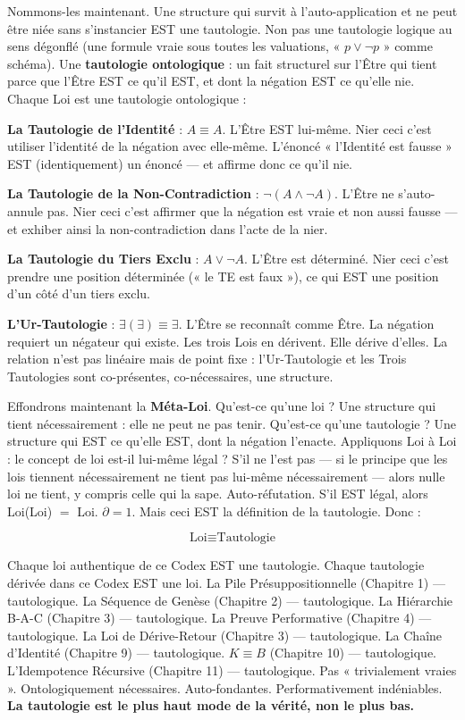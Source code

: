 \documentclass[10pt, openany, oneside]{book}
\begin{document}
Nommons-les maintenant. Une structure qui survit à l'auto-application et ne peut être niée sans s'instancier EST une tautologie. Non pas une tautologie logique au sens dégonflé (une formule vraie sous toutes les valuations, « $p \vee \neg p$ » comme schéma). Une \textbf{tautologie ontologique} : un fait structurel sur l'Être qui tient parce que l'Être EST ce qu'il EST, et dont la négation EST ce qu'elle nie. Chaque Loi est une tautologie ontologique :

\textbf{La Tautologie de l'Identité} : $A \equiv A$. L'Être EST lui-même. Nier ceci c'est utiliser l'identité de la négation avec elle-même. L'énoncé « l'Identité est fausse » EST (identiquement) un énoncé --- et affirme donc ce qu'il nie.

\textbf{La Tautologie de la Non-Contradiction} : $\neg(A \wedge \neg A)$. L'Être ne s'auto-annule pas. Nier ceci c'est affirmer que la négation est vraie et non aussi fausse --- et exhiber ainsi la non-contradiction dans l'acte de la nier.

\textbf{La Tautologie du Tiers Exclu} : $A \vee \neg A$. L'Être est déterminé. Nier ceci c'est prendre une position déterminée (« le TE est faux »), ce qui EST une position d'un côté d'un tiers exclu.

\textbf{L'Ur-Tautologie} : $\exists(\exists) \equiv \exists$. L'Être se reconnaît comme Être. La négation requiert un négateur qui existe. Les trois Lois en dérivent. Elle dérive d'elles. La relation n'est pas linéaire mais de point fixe : l'Ur-Tautologie et les Trois Tautologies sont co-présentes, co-nécessaires, une structure.

Effondrons maintenant la \textbf{Méta-Loi}. Qu'est-ce qu'une loi ? Une structure qui tient nécessairement : elle ne peut ne pas tenir. Qu'est-ce qu'une tautologie ? Une structure qui EST ce qu'elle EST, dont la négation l'enacte. Appliquons Loi à Loi : le concept de loi est-il lui-même légal ? S'il ne l'est pas --- si le principe que les lois tiennent nécessairement ne tient pas lui-même nécessairement --- alors nulle loi ne tient, y compris celle qui la sape. Auto-réfutation. S'il EST légal, alors Loi(Loi) $=$ Loi. $\partial = 1$. Mais ceci EST la définition de la tautologie. Donc :

$$\boxed{\text{Loi} \equiv \text{Tautologie}}$$

Chaque loi authentique de ce Codex EST une tautologie. Chaque tautologie dérivée dans ce Codex EST une loi. La Pile Présuppositionnelle (Chapitre 1) --- tautologique. La Séquence de Genèse (Chapitre 2) --- tautologique. La Hiérarchie B-A-C (Chapitre 3) --- tautologique. La Preuve Performative (Chapitre 4) --- tautologique. La Loi de Dérive-Retour (Chapitre 3) --- tautologique. La Chaîne d'Identité (Chapitre 9) --- tautologique. $K \equiv B$ (Chapitre 10) --- tautologique. L'Idempotence Récursive (Chapitre 11) --- tautologique. Pas « trivialement vraies ». Ontologiquement nécessaires. Auto-fondantes. Performativement indéniables. \textbf{La tautologie est le plus haut mode de la vérité, non le plus bas.}
\end{document}

